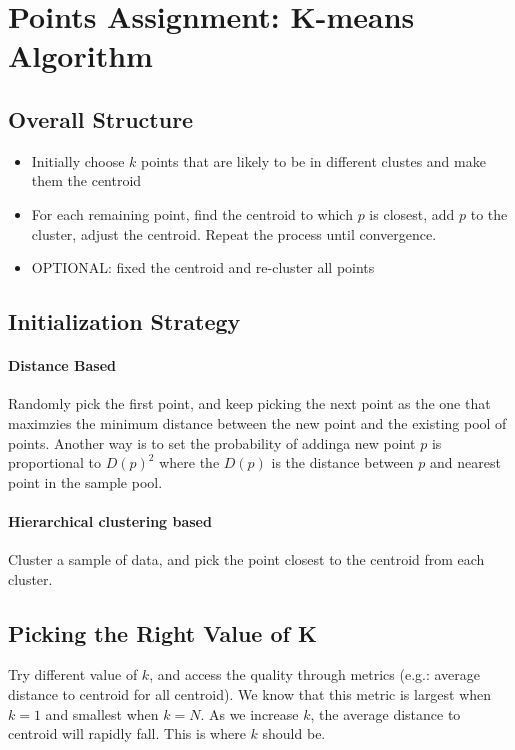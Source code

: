 \section{Points Assignment: K-means Algorithm}
\subsection{Overall Structure} 
\begin{itemize}
    \item Initially choose $k$ points that are likely to be in different clustes and make them the centroid 
    \item For each remaining point, find the centroid to which $p$ is closest, add $p$ to the cluster, adjust the centroid. Repeat the process until convergence. 
    \item OPTIONAL: fixed the centroid and re-cluster all points 
\end{itemize}

\subsection{Initialization Strategy} 
\paragraph{Distance Based} Randomly pick the first point, and keep picking the next point as the one that maximzies the minimum distance between the new point and the existing pool of points. Another way is to set the probability of addinga new point $p$ is proportional to $D(p)^2$ where the $D(p)$ is the distance between $p$ and nearest point in the sample pool. 

\paragraph{Hierarchical clustering based} Cluster a sample of data, and pick the point closest to the centroid from each cluster. 

\subsection{Picking the Right Value of K} 
Try different value of $k$, and access the quality through metrics (e.g.: average distance to centroid for all centroid). We know that this metric is largest when $k=1$ and smallest when $k=N$. As we increase $k$, the average distance to centroid will rapidly fall. This is where $k$ should be. 


